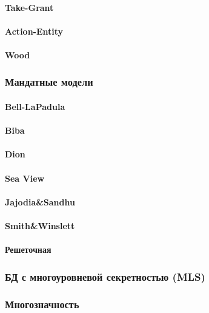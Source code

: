 \paragraph{Take-Grant}
\paragraph{Action-Entity}
\paragraph{Wood}

\subsubsection{Мандатные модели}
\paragraph{Bell-LaPadula}
\paragraph{Biba}
\paragraph{Dion}
\paragraph{Sea View}
\paragraph{Jajodia\&Sandhu}
\paragraph{Smith\&Winslett}
\paragraph{Решеточная}

\subsubsection{БД с многоуровневой секретностью (MLS)}
\subsubsection{Многозначность}